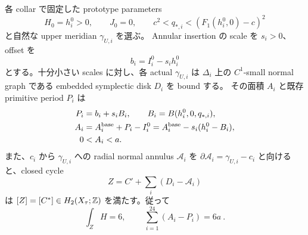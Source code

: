 \begin{theorem}\label{ad:disks}
各 collar で固定した prototype parameters
\[
 H_0=h_i^0>0,\qquad J_0=0,\qquad
 c^2<q_{*,i}<(F_1(h_i^0,0)-c)^2
\]
と自然な upper meridian $\gamma_{U,i}$ を選ぶ。
Annular insertion の scale を $s_i>0$、offset を
\[
 b_i=I_i^0-s_i h_i^0
\]
とする。十分小さい scales に対し、各 actual $\gamma_{U,i}$ は
$\Delta_i$ 上の $C^1$-small normal graph である embedded symplectic disk $D_i$ を bound する。
その面積 $A_i$ と既存 primitive period $P_i$ は
\begin{align}
 P_i&=b_i+s_i B_i,\qquad B_i=B(h_i^0,0,q_{*,i}),\label{ad:period}\\
 A_i&=A_i^{\rm base}+P_i-I_i^0
     =A_i^{\rm base}-s_i(h_i^0-B_i),\label{ad:disk-area}\\
 0&<A_i<a.\nonumber
\end{align}
また、$c_i$ から $\gamma_{U,i}$ への radial normal annulus $\mathcal A_i$ を
$\partial\mathcal A_i=\gamma_{U,i}-c_i$ と向けると、closed cycle
\begin{equation}\label{ad:cycle}
 Z=C'+\sum_i(D_i-\mathcal A_i)
\end{equation}
は $[Z]=[C^*]\in H_2(X_\tau;\mathbb Z)$ を満たす。従って
\begin{equation}\label{ad:budget}
 \int_ZH=6,\qquad \boxed{\ \sum_{i=1}^{24}(A_i-P_i)=6a\ }.
\end{equation}
\end{theorem}


